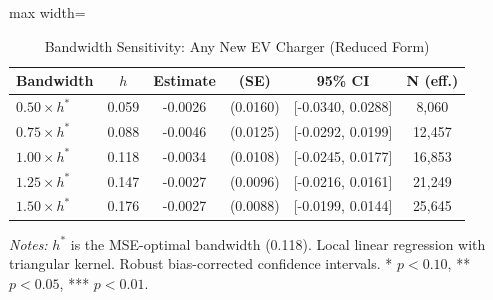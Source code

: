 \begin{table}[H]
\centering
\caption{Bandwidth Sensitivity: Any New EV Charger (Reduced Form)}
\begin{threeparttable}
\begin{adjustbox}{max width=\textwidth}
\begin{tabular}{lccccc}
\toprule
Bandwidth & $h$ & Estimate & (SE) & 95\% CI & N (eff.) \\
\midrule
$0.50 \times h^*$ & 0.059 & -0.0026 & (0.0160) & [-0.0340, 0.0288] & 8,060 \\
$0.75 \times h^*$ & 0.088 & -0.0046 & (0.0125) & [-0.0292, 0.0199] & 12,457 \\
$1.00 \times h^*$ & 0.118 & -0.0034 & (0.0108) & [-0.0245, 0.0177] & 16,853 \\
$1.25 \times h^*$ & 0.147 & -0.0027 & (0.0096) & [-0.0216, 0.0161] & 21,249 \\
$1.50 \times h^*$ & 0.176 & -0.0027 & (0.0088) & [-0.0199, 0.0144] & 25,645 \\
\bottomrule
\end{tabular}
\end{adjustbox}
\begin{tablenotes}[flushleft]
\small
\item \textit{Notes:} $h^*$ is the MSE-optimal bandwidth (0.118). Local linear regression with triangular kernel. Robust bias-corrected confidence intervals. * $p<0.10$, ** $p<0.05$, *** $p<0.01$.
\end{tablenotes}
\end{threeparttable}
\label{tab:bw}
\end{table}

